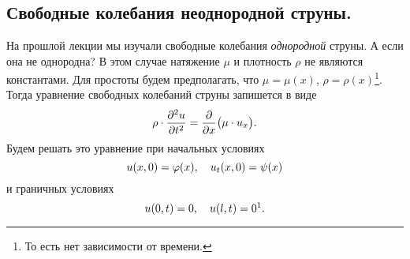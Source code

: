 	\chapter{}
\label{lecture13}
\section{Свободные колебания неоднородной струны.}
\label{lecture13section1}
На прошлой лекции мы изучали свободные колебания \emph{однородной} струны. А если она не однородна? В этом случае натяжение $\mu$ и плотность $\rho$ не являются константами. Для простоты будем предполагать, что $\mu=\mu(x)$, $\rho=\rho(x)$\footnote[1]{То есть нет зависимости от времени.}. Тогда уравнение свободных колебаний струны запишется в виде
\begin{equation}\label{l13:eq:1}
	\hfill\rho\cdot\pdder{u}{t}=\pder{}{x}\big(\mu\cdot u_x\big).\hfill
\end{equation}
Будем решать это уравнение при начальных условиях
\begin{equation}\label{l13:eq:2}
	\hfill u(x,0)=\phi(x),\quad u_t(x,0)=\psi(x)\hfill
\end{equation}
и граничных условиях
\begin{equation}\label{l13:eq:3}
	\hfill u(0,t)=0,\quad u(l,t)=0\footnotemark{}.\hfill
\end{equation}

